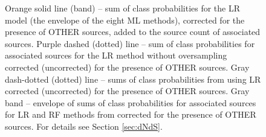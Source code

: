 \begin{figure}[h]
{Orange solid line (band) -- sum of class probabilities for the LR model (the envelope of the eight ML methods), corrected for the presence of OTHER sources, added to the source count of associated sources. 
Purple dashed (dotted) line -- sum of class probabilities for associated sources for the LR method without oversampling corrected (uncorrected)
for the presence of OTHER sources.
Gray dash-dotted (dotted) line -- sums of class probabilities from \cite{2016ApJ...820....8S} using LR corrected (uncorrected) for the presence of OTHER sources.
Gray band -- envelope of sums of class probabilities for associated sources for LR and RF methods from \cite{2016ApJ...820....8S} corrected for the presence of OTHER sources.
For details see Section \ref{sec:dNdS}.}  
\label{fig:logN_logS}
\end{figure}


